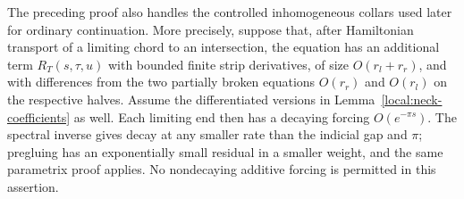 The preceding proof also handles the controlled inhomogeneous collars
used later for ordinary continuation.  More precisely, suppose that,
after Hamiltonian transport of a limiting chord to an intersection,
the equation has an additional term $R_T(s,\tau,u)$ with bounded finite
strip derivatives, of size $O(r_l+r_r)$, and with differences from the
two partially broken equations $O(r_r)$ and $O(r_l)$ on the respective
halves.  Assume the differentiated versions in
Lemma~\ref{local:neck-coefficients} as well.  Each limiting end then
has a decaying forcing $O(e^{-\pi s})$.  The spectral inverse gives
decay at any smaller rate than the indicial gap and $\pi$; pregluing
has an exponentially small residual in a smaller weight, and the
same parametrix proof applies.  No nondecaying additive forcing is
permitted in this assertion.

